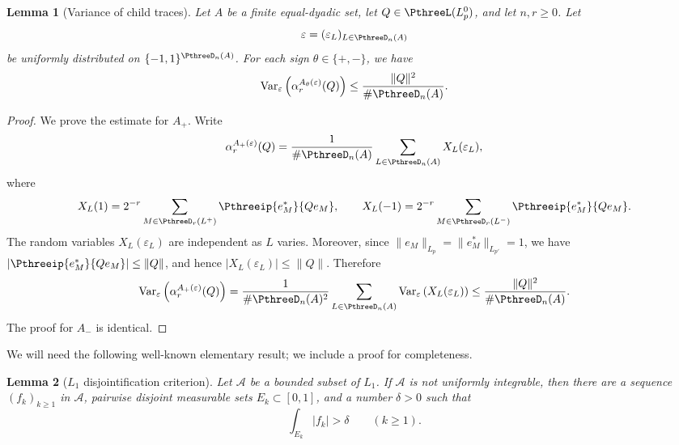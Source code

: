 \documentclass[11pt,reqno]{amsart}
\makeatletter
\theoremstyle{plain}
\newtheorem{lemma}[lemma]{Lemma}
\theoremstyle{definition}
\newcounter{problempaper}
\newenvironment{problempaperbody}{%
  \setcounter{subsection}{0}%
  \setcounter{subsubsection}{0}%
  \setcounter{paragraph}{0}%
  \renewcommand{\thesubsection}{\arabic{subsection}}%
  \renewcommand{\thesubsubsection}{\thesubsection.\arabic{subsubsection}}%
  \renewcommand{\theparagraph}{\thesubsubsection.\arabic{paragraph}}%
  \let\problem@outersection\section
  \let\problem@outersubsection\subsection
  \let\problem@outersubsubsection\subsubsection
  \let\problem@outerparagraph\paragraph
  \let\section\problem@papersection
  \let\subsection\problem@papersubsection
  \let\subsubsection\problem@papersubsubsection
}{%
  \let\section\problem@outersection
  \let\subsection\problem@outersubsection
  \let\subsubsection\problem@outersubsubsection
  \let\paragraph\problem@outerparagraph
}
\newcommand{\problem@target}[2]{%
  \hypertarget{problem-\theproblempaper-#1-#2}{}%
}
\newcommand{\problem@paperheading}[3]{%
  \par\bigskip
  \problem@target{#1}{#2}%
  \noindent{\large\bfseries #2.\quad #3\par}%
  \nobreak\smallskip
}
\newcommand{\problem@papersubheading}[3]{%
  \par\medskip
  \problem@target{#1}{#2}%
  \noindent{\normalsize\bfseries #2.\quad #3\par}%
  \nobreak\smallskip
}
\newcommand{\problem@papersubsubheading}[3]{%
  \par\smallskip
  \problem@target{#1}{#2}%
  \noindent{\normalsize\itshape #2.\quad #3.\ }%
}
\def\problem@papersection{%
  \@ifstar{\problem@papersectionstar}{\problem@papersectionnostar}%
}
\def\problem@papersectionstar#1{%
  \par\bigskip\noindent{\large\bfseries #1\par}\nobreak\smallskip
}
\def\problem@papersectionnostar#1{%
  \refstepcounter{subsection}%
  \setcounter{subsubsection}{0}%
  \setcounter{paragraph}{0}%
  \problem@paperheading{section}{\thesubsection}{#1}%
  \problem@writecontentsline{section}{\thesubsection}{#1}%
}
\def\problem@papersubsection{%
  \@ifstar{\problem@papersubsectionstar}{\problem@papersubsectionnostar}%
}
\def\problem@papersubsectionstar#1{%
  \par\medskip\noindent{\normalsize\bfseries #1\par}\nobreak\smallskip
}
\def\problem@papersubsectionnostar#1{%
  \refstepcounter{subsubsection}%
  \setcounter{paragraph}{0}%
  \problem@papersubheading{subsection}{\thesubsubsection}{#1}%
  \problem@writecontentsline{subsection}{\thesubsubsection}{#1}%
}
\def\problem@papersubsubsection{%
  \@ifstar{\problem@papersubsubsectionstar}{\problem@papersubsubsectionnostar}%
}
\def\problem@papersubsubsectionstar#1{%
  \par\smallskip\noindent{\normalsize\itshape #1.\ }%
}
\def\problem@papersubsubsectionnostar#1{%
  \refstepcounter{paragraph}%
  \problem@papersubsubheading{subsubsection}{\theparagraph}{#1}%
  \problem@writecontentsline{subsubsection}{\theparagraph}{#1}%
}
\newcommand{\problem@writecontentsline}[3]{%
  \begingroup
  \protected@write\@auxout{}{%
    \string\problemcontentsentry{\theproblempaper}{#1}{#2}{#3}{\thepage}%
  }%
  \endgroup
}
\newcommand{\problemcontentsentry}[5]{%
  \@ifundefined{problemcontents@#1}{%
    \expandafter\gdef\csname problemcontents@#1\endcsname{}%
  }{}%
  \expandafter\g@addto@macro\csname problemcontents@#1\endcsname{%
    \problemcontentsline{#1}{#2}{#3}{#4}{#5}%
  }%
}
\newcommand{\problemcontentslink}[4]{%
  \hyperlink{problem-#1-#2-#3}{#4}%
}
\newcommand{\problemcontentsline}[5]{%
  \ifstrequal{#2}{section}{%
    \par\noindent
    \problemcontentslink{#1}{#2}{#3}{\makebox[2.5em][l]{#3}#4}%
    \nobreak\dotfill
    \problemcontentslink{#1}{#2}{#3}{#5}\par
  }{%
    \ifstrequal{#2}{subsection}{%
      \par\noindent\hspace*{1.5em}%
      \problemcontentslink{#1}{#2}{#3}{\makebox[3.5em][l]{#3}#4}%
      \nobreak\dotfill
      \problemcontentslink{#1}{#2}{#3}{#5}\par
    }{%
      \par\noindent\hspace*{3em}%
      \problemcontentslink{#1}{#2}{#3}{\makebox[4.5em][l]{#3}#4}%
      \nobreak\dotfill
      \problemcontentslink{#1}{#2}{#3}{#5}\par
    }%
  }%
}
\makeatother
\begin{document}
\begin{problempaperbody}
\begin{lemma}[Variance of child traces]
\label{p3:lem:child-trace-variance}
Let $A$ be a finite equal-dyadic set, let $Q\in\PthreeL(L_p^0)$, and let $n,r\geq0$. Let
\begin{equation*}
        \varepsilon=(\varepsilon_L)_{L\in\PthreeD_n(A)}
\end{equation*}
be uniformly distributed on $\{-1,1\}^{\PthreeD_n(A)}$. For each sign $\theta\in\{+,-\}$, we have
\begin{equation}
\label{p3:eq:child-trace-variance}
        \operatorname{Var}_\varepsilon\left(\alpha_r^{A_\theta(\varepsilon)}(Q)\right)\leq\frac{\|Q\|^2}{\#\PthreeD_n(A)}.
\end{equation}
\end{lemma}
\begin{proof}
We prove the estimate for $A_+$. Write
\begin{equation*}
        \alpha_r^{A_+(\varepsilon)}(Q)=\frac1{\#\PthreeD_n(A)}\sum_{L\in\PthreeD_n(A)}X_L(\varepsilon_L),
\end{equation*}
where
\begin{equation*}
        X_L(1)=2^{-r}\sum_{M\in\PthreeD_r(L^+)}\Pthreeip{e_M^*}{Qe_M},\qquad X_L(-1)=2^{-r}\sum_{M\in\PthreeD_r(L^-)}\Pthreeip{e_M^*}{Qe_M}.
\end{equation*}
The random variables $X_L(\varepsilon_L)$ are independent as $L$ varies. Moreover, since $\|e_M\|_{L_p}=\|e_M^*\|_{L_{p'}}=1$, we have $|\Pthreeip{e_M^*}{Qe_M}|\leq\|Q\|$, and hence $|X_L(\varepsilon_L)|\leq\|Q\|$. Therefore
\begin{equation*}
        \operatorname{Var}_\varepsilon\left(\alpha_r^{A_+(\varepsilon)}(Q)\right)=\frac1{\#\PthreeD_n(A)^2}\sum_{L\in\PthreeD_n(A)}\operatorname{Var}_\varepsilon\left(X_L(\varepsilon_L)\right)\leq\frac{\|Q\|^2}{\#\PthreeD_n(A)}.
\end{equation*}
The proof for $A_-$ is identical.
\end{proof}

We will need the following well-known elementary result; we include a proof for completeness.

\begin{lemma}[$L_1$ disjointification criterion]
\label{p3:lem:l1-disjointification}
Let $\mathcal A$ be a bounded subset of $L_1$.  If $\mathcal A$ is not uniformly integrable, then there are a sequence $(f_k)_{k\geq1}$ in $\mathcal A$, pairwise disjoint measurable sets $E_k\subset[0,1]$, and a number $\delta>0$ such that
\begin{equation*}
        \int_{E_k}|f_k|>\delta\qquad(k\geq1).
\end{equation*}
\end{lemma}


\end{problempaperbody}
\end{document}
